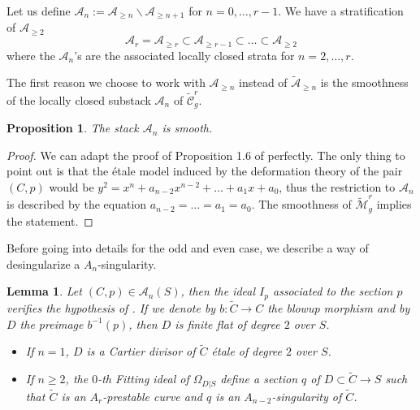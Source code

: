 \documentclass{alggeom}
\numberwithin{equation}{section}
\numberwithin{subsection}{section}
\newtheorem{proposition}[theorem]{Proposition}
\newtheorem{lemma}[theorem]{Lemma}
\theoremstyle{definition}
\theoremstyle{remark}
\newcommand\cA{\mathcal{A}} \newcommand\cB{\mathcal{B}}
\renewcommand{\setminus}{\smallsetminus}
\newcommand{\Mtilde}{\widetilde{\mathcal M}}
\newcommand{\Ctilde}{\widetilde{\mathcal C}}
\begin{document}
Let us define $\cA_n:=\cA_{\geq n}\setminus \cA_{\geq n+1}$ for  $n=0,\dots,r-1$. We have a stratification of $\cA_{\geq 2}$
$$ \cA_{r}=\cA_{\geq r} \subset \cA_{\geq r-1} \subset \dots \subset \cA_{\geq 2}$$ 
where the $\cA_n$'s are the associated locally closed strata for $n=2,\dots, r$. 

The first reason we choose to work with $\cA_{\geq n}$ instead of $\widetilde{\cA}_{\geq n}$ is the smoothness of the locally closed substack $\cA_n$ of $\Ctilde_g^r$.

\begin{proposition}
	The stack $\cA_n$ is smooth.
\end{proposition}

\begin{proof}
	We can adapt the proof of Proposition 1.6 of \cite{DiLorPerVis} perfectly. The only thing to point out is that the \'etale model induced by the deformation theory of the pair $(C,p)$  would be $y^2=x^n+a_{n-2}x^{n-2}+\dots+a_1x+a_0$, thus the restriction to $\cA_n$ is described by the equation $a_{n-2}=\dots=a_1=a_0$. The smoothness of $\Mtilde_g^r$ implies the statement.
\end{proof}

Before going into details for the odd and even case, we describe a way of desingularize a $A_n$-singularity.


\begin{lemma}\label{lem:blowup-an}
	Let $(C,p) \in \cA_n(S)$, then the ideal $I_p$ associated to the section $p$ verifies the hypothesis of . If we denote by $b:\widetilde{C}\rightarrow C$ the blowup morphism and by $D$ the preimage $b^{-1}(p)$, then $D$ is finite flat of degree $2$ over $S$.
	\begin{itemize}
		\item If $n=1$, $D$ is a Cartier divisor of $\widetilde{C}$ \'etale of degree $2$ over $S$.	
		\item If $n\geq 2$, the $0$-th Fitting ideal of $\Omega_{D|S}$ define a section $q$ of $D\subset \widetilde{C}\rightarrow S$ such that $\widetilde{C}$ is an $A_r$-prestable curve and $q$ is an $A_{n-2}$-singularity of $\widetilde{C}$. 
	\end{itemize} 
\end{lemma}
\end{document}
